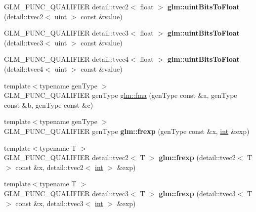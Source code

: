 \begin{DoxyCompactItemize}
\item 
\hypertarget{namespaceglm_a5ce140553687f4d212a18f472972c543}{}G\+L\+M\+\_\+\+F\+U\+N\+C\+\_\+\+Q\+U\+A\+L\+I\+F\+I\+E\+R detail\+::tvec2$<$ float $>$ {\bfseries glm\+::uint\+Bits\+To\+Float} (detail\+::tvec2$<$ uint $>$ const \&value)\label{namespaceglm_a5ce140553687f4d212a18f472972c543}

\item 
\hypertarget{namespaceglm_ac96c797cb01d4d6db5a0b5537b56697b}{}G\+L\+M\+\_\+\+F\+U\+N\+C\+\_\+\+Q\+U\+A\+L\+I\+F\+I\+E\+R detail\+::tvec3$<$ float $>$ {\bfseries glm\+::uint\+Bits\+To\+Float} (detail\+::tvec3$<$ uint $>$ const \&value)\label{namespaceglm_ac96c797cb01d4d6db5a0b5537b56697b}

\item 
\hypertarget{namespaceglm_a8facefb72a43a5283824d120347b6537}{}G\+L\+M\+\_\+\+F\+U\+N\+C\+\_\+\+Q\+U\+A\+L\+I\+F\+I\+E\+R detail\+::tvec4$<$ float $>$ {\bfseries glm\+::uint\+Bits\+To\+Float} (detail\+::tvec4$<$ uint $>$ const \&value)\label{namespaceglm_a8facefb72a43a5283824d120347b6537}

\item 
{\footnotesize template$<$typename gen\+Type $>$ }\\G\+L\+M\+\_\+\+F\+U\+N\+C\+\_\+\+Q\+U\+A\+L\+I\+F\+I\+E\+R gen\+Type \hyperlink{group__core__func__common_gad0f444d4b81cc53c3b6edf5aa25078c2}{glm\+::fma} (gen\+Type const \&a, gen\+Type const \&b, gen\+Type const \&c)
\item 
\hypertarget{namespaceglm_a3fab9fc606511c1751ff2173afccaa6e}{}{\footnotesize template$<$typename gen\+Type $>$ }\\G\+L\+M\+\_\+\+F\+U\+N\+C\+\_\+\+Q\+U\+A\+L\+I\+F\+I\+E\+R gen\+Type {\bfseries glm\+::frexp} (gen\+Type const \&x, \hyperlink{_s_d_l__thread_8h_a6a64f9be4433e4de6e2f2f548cf3c08e}{int} \&exp)\label{namespaceglm_a3fab9fc606511c1751ff2173afccaa6e}

\item 
\hypertarget{namespaceglm_a2816d346bb147ce8e9d54d5c01acb790}{}{\footnotesize template$<$typename T $>$ }\\G\+L\+M\+\_\+\+F\+U\+N\+C\+\_\+\+Q\+U\+A\+L\+I\+F\+I\+E\+R detail\+::tvec2$<$ T $>$ {\bfseries glm\+::frexp} (detail\+::tvec2$<$ T $>$ const \&x, detail\+::tvec2$<$ \hyperlink{_s_d_l__thread_8h_a6a64f9be4433e4de6e2f2f548cf3c08e}{int} $>$ \&exp)\label{namespaceglm_a2816d346bb147ce8e9d54d5c01acb790}

\item 
\hypertarget{namespaceglm_a228690eed3874fcddef0b74864018a97}{}{\footnotesize template$<$typename T $>$ }\\G\+L\+M\+\_\+\+F\+U\+N\+C\+\_\+\+Q\+U\+A\+L\+I\+F\+I\+E\+R detail\+::tvec3$<$ T $>$ {\bfseries glm\+::frexp} (detail\+::tvec3$<$ T $>$ const \&x, detail\+::tvec3$<$ \hyperlink{_s_d_l__thread_8h_a6a64f9be4433e4de6e2f2f548cf3c08e}{int} $>$ \&exp)\label{namespaceglm_a228690eed3874fcddef0b74864018a97}


\end{DoxyCompactItemize}
